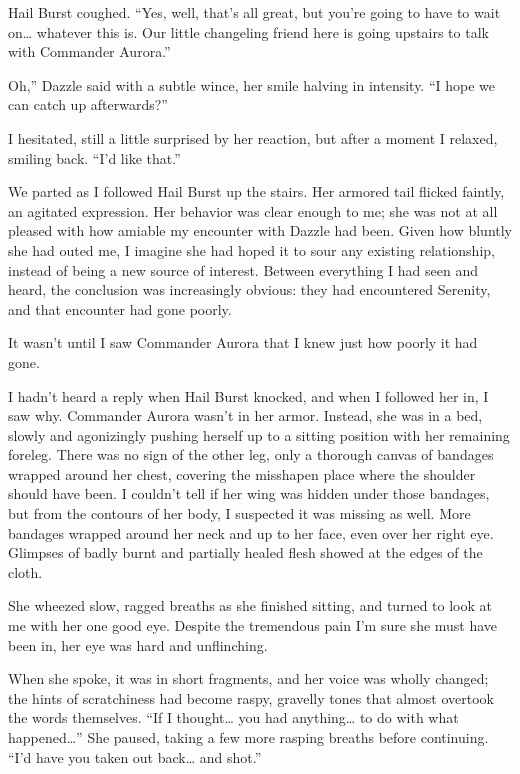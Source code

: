 Hail Burst coughed. “Yes, well, that’s all great, but you’re going to have to wait on… whatever this is. Our little changeling friend here is going upstairs to talk with Commander Aurora.”

\leavevmode{}Oh,” Dazzle said with a subtle wince, her smile halving in intensity. “I hope we can catch up afterwards?”

I hesitated, still a little surprised by her reaction, but after a moment I relaxed, smiling back. “I’d like that.”

We parted as I followed Hail Burst up the stairs. Her armored tail flicked faintly, an agitated expression. Her behavior was clear enough to me; she was not at all pleased with how amiable my encounter with Dazzle had been. Given how bluntly she had outed me, I imagine she had hoped it to sour any existing relationship, instead of being a new source of interest. Between everything I had seen and heard, the conclusion was increasingly obvious: they had encountered Serenity, and that encounter had gone poorly.

It wasn’t until I saw Commander Aurora that I knew just how poorly it had gone.

I hadn’t heard a reply when Hail Burst knocked, and when I followed her in, I saw why. Commander Aurora wasn’t in her armor. Instead, she was in a bed, slowly and agonizingly pushing herself up to a sitting position with her remaining foreleg. There was no sign of the other leg, only a thorough canvas of bandages wrapped around her chest, covering the misshapen place where the shoulder should have been. I couldn’t tell if her wing was hidden under those bandages, but from the contours of her body, I suspected it was missing as well. More bandages wrapped around her neck and up to her face, even over her right eye. Glimpses of badly burnt and partially healed flesh showed at the edges of the cloth.

She wheezed slow, ragged breaths as she finished sitting, and turned to look at me with her one good eye. Despite the tremendous pain I’m sure she must have been in, her eye was hard and unflinching.

When she spoke, it was in short fragments, and her voice was wholly changed; the hints of scratchiness had become raspy, gravelly tones that almost overtook the words themselves. “If I thought… you had anything… to do with what happened…” She paused, taking a few more rasping breaths before continuing. “I’d have you taken out back… and shot.”

